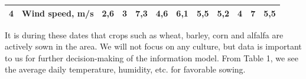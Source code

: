 \begin{table}[H]
\begin{tabular}{|r|l|rr|rr|rr|rr|rr|}
4                                        & Wind speed, m/s             & \multicolumn{1}{r|}{2,6}         & 3                                & \multicolumn{1}{r|}{7,3}         & 4,6                              & \multicolumn{1}{r|}{6,1}         & 5,5                              & \multicolumn{1}{r|}{5,2}         & 4                                & \multicolumn{1}{r|}{7}           & 5,5                              \\ \hline
\end{tabular}%
\end{table}

\begin{multicols}{2}
It is during these dates that crops such as wheat, barley, corn and
alfalfa are actively sown in the area. We will not focus on any culture,
but data is important to us for further decision-making of the
information model. From Table 1, we see the average daily temperature,
humidity, etc. for favorable sowing.
\end{multicols}

